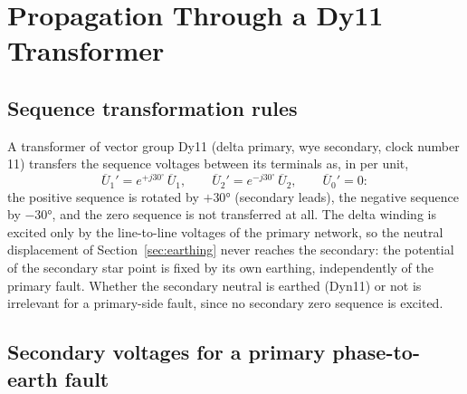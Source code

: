 \documentclass[a4paper,11pt]{article}
\begin{document}
\section{Propagation Through a Dy11 Transformer}
\label{sec:dy11}

\subsection{Sequence transformation rules}

A transformer of vector group Dy11 (delta primary, wye secondary, clock
number 11) transfers the sequence voltages between its terminals as, in per
unit,
\begin{equation}
\overline{U}_{1}' = e^{+j30^{\circ}}\,\overline{U}_{1}, \qquad
\overline{U}_{2}' = e^{-j30^{\circ}}\,\overline{U}_{2}, \qquad
\overline{U}_{0}' = 0 :
\label{eq:dy11rules}
\end{equation}
the positive sequence is rotated by $+\ang{30}$ (secondary leads), the
negative sequence by $-\ang{30}$, and the zero sequence is not transferred at
all. The delta winding is excited only by the line-to-line voltages of the
primary network, so the neutral displacement of Section~\ref{sec:earthing}
never reaches the secondary: the potential of the secondary star point is
fixed by its own earthing, independently of the primary fault. Whether the
secondary neutral is earthed (Dyn11) or not is irrelevant for a primary-side
fault, since no secondary zero sequence is excited.

\subsection{Secondary voltages for a primary phase-to-earth fault}
\end{document}
